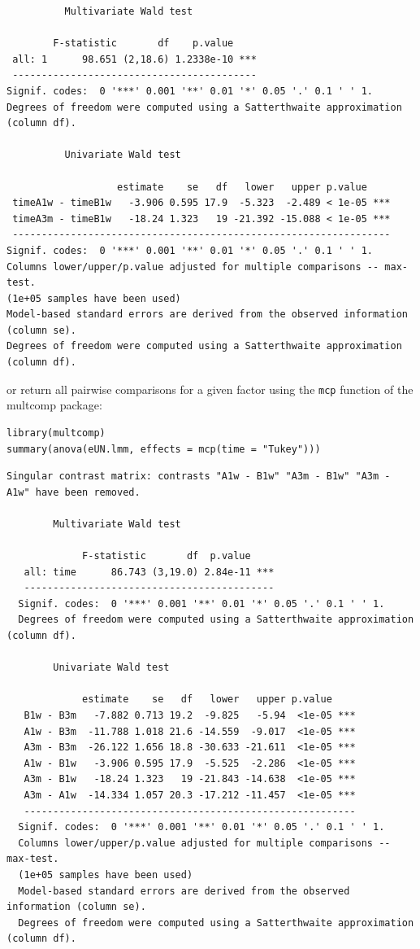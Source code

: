 \documentclass[12pt]{article}
\begin{document}
\begin{verbatim}
	      Multivariate Wald test 

        F-statistic       df    p.value    
 all: 1      98.651 (2,18.6) 1.2338e-10 ***
 ------------------------------------------ 
Signif. codes:  0 '***' 0.001 '**' 0.01 '*' 0.05 '.' 0.1 ' ' 1.
Degrees of freedom were computed using a Satterthwaite approximation (column df). 

	      Univariate Wald test 

                   estimate    se   df   lower   upper p.value    
 timeA1w - timeB1w   -3.906 0.595 17.9  -5.323  -2.489 < 1e-05 ***
 timeA3m - timeB1w   -18.24 1.323   19 -21.392 -15.088 < 1e-05 ***
 ----------------------------------------------------------------- 
Signif. codes:  0 '***' 0.001 '**' 0.01 '*' 0.05 '.' 0.1 ' ' 1.
Columns lower/upper/p.value adjusted for multiple comparisons -- max-test.
(1e+05 samples have been used)
Model-based standard errors are derived from the observed information (column se). 
Degrees of freedom were computed using a Satterthwaite approximation (column df).
\end{verbatim}

\clearpage

or return all pairwise comparisons for a given factor using the \texttt{mcp}
function of the multcomp package:
\lstset{language=r,label= ,caption= ,captionpos=b,numbers=none}
\begin{lstlisting}
library(multcomp)
summary(anova(eUN.lmm, effects = mcp(time = "Tukey")))
\end{lstlisting}

\begin{verbatim}
Singular contrast matrix: contrasts "A1w - B1w" "A3m - B1w" "A3m - A1w" have been removed. 

		Multivariate Wald test 

             F-statistic       df  p.value    
   all: time      86.743 (3,19.0) 2.84e-11 ***
   ------------------------------------------- 
  Signif. codes:  0 '***' 0.001 '**' 0.01 '*' 0.05 '.' 0.1 ' ' 1.
  Degrees of freedom were computed using a Satterthwaite approximation (column df). 

		Univariate Wald test 

             estimate    se   df   lower   upper p.value    
   B1w - B3m   -7.882 0.713 19.2  -9.825   -5.94  <1e-05 ***
   A1w - B3m  -11.788 1.018 21.6 -14.559  -9.017  <1e-05 ***
   A3m - B3m  -26.122 1.656 18.8 -30.633 -21.611  <1e-05 ***
   A1w - B1w   -3.906 0.595 17.9  -5.525  -2.286  <1e-05 ***
   A3m - B1w   -18.24 1.323   19 -21.843 -14.638  <1e-05 ***
   A3m - A1w  -14.334 1.057 20.3 -17.212 -11.457  <1e-05 ***
   --------------------------------------------------------- 
  Signif. codes:  0 '***' 0.001 '**' 0.01 '*' 0.05 '.' 0.1 ' ' 1.
  Columns lower/upper/p.value adjusted for multiple comparisons -- max-test.
  (1e+05 samples have been used)
  Model-based standard errors are derived from the observed information (column se). 
  Degrees of freedom were computed using a Satterthwaite approximation (column df).
\end{verbatim}
\end{document}
